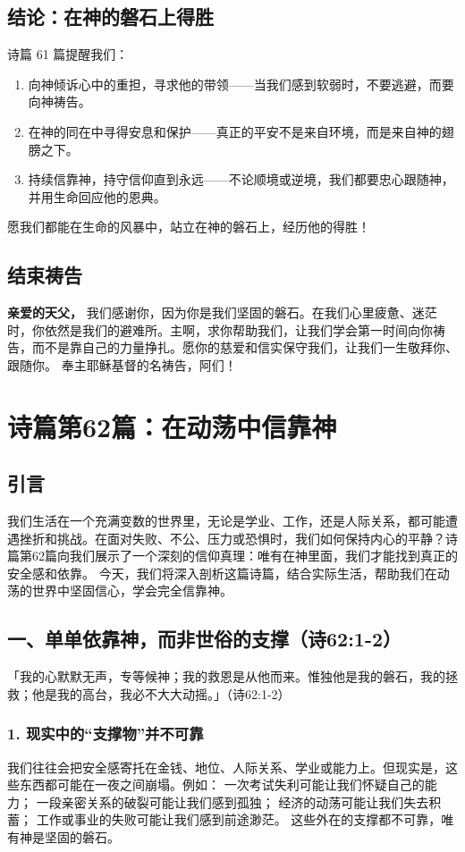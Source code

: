 \documentclass[a4paper, 12pt]{article}
\begin{document}
\subsection*{结论：在神的磐石上得胜}
诗篇 61 篇提醒我们：
\begin{enumerate}
    \item 向神倾诉心中的重担，寻求他的带领——当我们感到软弱时，不要逃避，而要向神祷告。

    \item 在神的同在中寻得安息和保护——真正的平安不是来自环境，而是来自神的翅膀之下。

    \item 持续信靠神，持守信仰直到永远——不论顺境或逆境，我们都要忠心跟随神，并用生命回应他的恩典。

\end{enumerate}

愿我们都能在生命的风暴中，站立在神的磐石上，经历他的得胜！

\subsection*{结束祷告}
\textbf{亲爱的天父，}
我们感谢你，因为你是我们坚固的磐石。在我们心里疲惫、迷茫时，你依然是我们的避难所。主啊，求你帮助我们，让我们学会第一时间向你祷告，而不是靠自己的力量挣扎。愿你的慈爱和信实保守我们，让我们一生敬拜你、跟随你。
奉主耶稣基督的名祷告，阿们！
\newpage
\section{诗篇第62篇：在动荡中信靠神}
\subsection*{引言}
我们生活在一个充满变数的世界里，无论是学业、工作，还是人际关系，都可能遭遇挫折和挑战。在面对失败、不公、压力或恐惧时，我们如何保持内心的平静？诗篇第62篇向我们展示了一个深刻的信仰真理：唯有在神里面，我们才能找到真正的安全感和依靠。
今天，我们将深入剖析这篇诗篇，结合实际生活，帮助我们在动荡的世界中坚固信心，学会完全信靠神。
\subsection*{一、单单依靠神，而非世俗的支撑（诗62:1-2）}
「我的心默默无声，专等候神；我的救恩是从他而来。惟独他是我的磐石，我的拯救；他是我的高台，我必不大大动摇。」（诗62:1-2）
\subsubsection*{1. 现实中的“支撑物”并不可靠}
我们往往会把安全感寄托在金钱、地位、人际关系、学业或能力上。但现实是，这些东西都可能在一夜之间崩塌。例如：
一次考试失利可能让我们怀疑自己的能力；
一段亲密关系的破裂可能让我们感到孤独；
经济的动荡可能让我们失去积蓄；
工作或事业的失败可能让我们感到前途渺茫。
这些外在的支撑都不可靠，唯有神是坚固的磐石。
\end{document}
